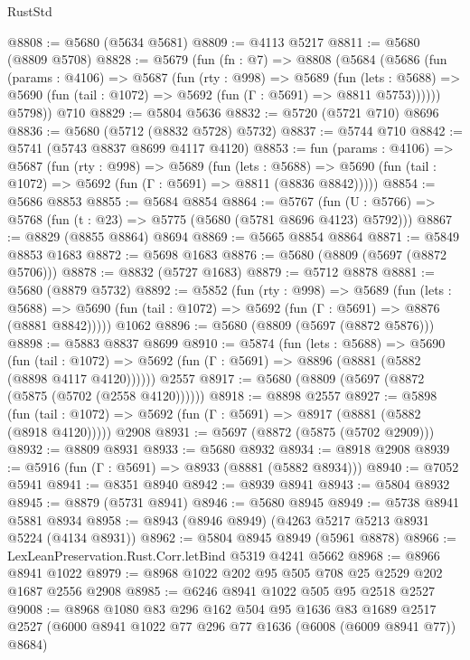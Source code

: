 \begin{lexlean}{RustStd}
\begin{coremodule}
@8808 := @5680 (@5634 @5681)
@8809 := @4113 @5217
@8811 := @5680 (@8809 @5708)
@8828 := @5679
    (fun (fn : @7) =>
    @8808
      (@5684
        (@5686
          (fun (params : @4106) =>
          @5687
            (fun (rty : @998) =>
            @5689
              (fun (lets : @5688) =>
              @5690 (fun (tail : @1072) => @5692 (fun (Γ : @5691) => @8811 @5753))))))
        @5798))
    @710
@8829 := @5804 @5636
@8832 := @5720 (@5721 @710) @8696
@8836 := @5680 (@5712 (@8832 @5728) @5732)
@8837 := @5744 @710
@8842 := @5741 (@5743 @8837 @8699 @4117 @4120)
@8853 := fun (params : @4106) =>
  @5687
    (fun (rty : @998) =>
    @5689
      (fun (lets : @5688) =>
      @5690 (fun (tail : @1072) => @5692 (fun (Γ : @5691) => @8811 (@8836 @8842)))))
@8854 := @5686 @8853
@8855 := @5684 @8854
@8864 := @5767 (fun (U : @5766) => @5768 (fun (t : @23) => @5775 (@5680 (@5781 @8696 @4123) @5792)))
@8867 := @8829 (@8855 @8864) @8694
@8869 := @5665 @8854 @8864
@8871 := @5849 @8853 @1683
@8872 := @5698 @1683
@8876 := @5680 (@8809 (@5697 (@8872 @5706)))
@8878 := @8832 (@5727 @1683)
@8879 := @5712 @8878
@8881 := @5680 (@8879 @5732)
@8892 := @5852
    (fun (rty : @998) =>
    @5689
      (fun (lets : @5688) =>
      @5690 (fun (tail : @1072) => @5692 (fun (Γ : @5691) => @8876 (@8881 @8842)))))
    @1062
@8896 := @5680 (@8809 (@5697 (@8872 @5876)))
@8898 := @5883 @8837 @8699
@8910 := @5874
    (fun (lets : @5688) =>
    @5690
      (fun (tail : @1072) => @5692 (fun (Γ : @5691) => @8896 (@8881 (@5882 (@8898 @4117 @4120))))))
    @2557
@8917 := @5680 (@8809 (@5697 (@8872 (@5875 (@5702 (@2558 @4120))))))
@8918 := @8898 @2557
@8927 := @5898
    (fun (tail : @1072) => @5692 (fun (Γ : @5691) => @8917 (@8881 (@5882 (@8918 @4120)))))
    @2908
@8931 := @5697 (@8872 (@5875 (@5702 @2909)))
@8932 := @8809 @8931
@8933 := @5680 @8932
@8934 := @8918 @2908
@8939 := @5916 (fun (Γ : @5691) => @8933 (@8881 (@5882 @8934)))
@8940 := @7052 @5941
@8941 := @8351 @8940
@8942 := @8939 @8941
@8943 := @5804 @8932
@8945 := @8879 (@5731 @8941)
@8946 := @5680 @8945
@8949 := @5738 @8941 @5881 @8934
@8958 := @8943 (@8946 @8949) (@4263 @5217 @5213 @8931 @5224 (@4134 @8931))
@8962 := @5804 @8945 @8949 (@5961 @8878)
@8966 := LexLeanPreservation.Rust.Corr.letBind @5319 @4241 @5662
@8968 := @8966 @8941 @1022
@8979 := @8968 @1022 @202 @95 @505 @708 @25 @2529 @202 @1687 @2556 @2908
@8985 := @6246 @8941 @1022 @505 @95 @2518 @2527
@9008 := @8968
    @1080
    @83
    @296
    @162
    @504
    @95
    @1636
    @83
    @1689
    @2517
    @2527
    (@6000 @8941 @1022 @77 @296 @77 @1636 (@6008 (@6009 @8941 @77)) @8684)

\end{coremodule}
\end{lexlean}
